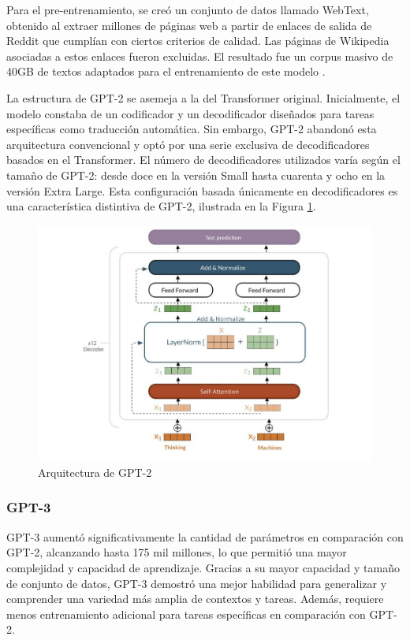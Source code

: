 Para el pre-entrenamiento, se creó un conjunto de datos llamado WebText, obtenido al extraer millones de páginas web a partir de enlaces de salida de Reddit que cumplían con ciertos criterios de calidad. Las páginas de Wikipedia asociadas a estos enlaces fueron excluidas. El resultado fue un corpus masivo de 40GB de textos adaptados para el entrenamiento de este modelo \citep{radford2019language}.

La estructura de GPT-2 se asemeja a la del Transformer original. Inicialmente, el modelo constaba de un codificador y un decodificador diseñados para tareas específicas como traducción automática. Sin embargo, GPT-2 abandonó esta arquitectura convencional y optó por una serie exclusiva de decodificadores basados en el Transformer. El número de decodificadores utilizados varía según el tamaño de GPT-2: desde doce en la versión Small hasta cuarenta y ocho en la versión Extra Large. Esta configuración basada únicamente en decodificadores es una característica distintiva de GPT-2, ilustrada en la Figura \ref{fig:gpt2_architecture}.

\begin{figure}
	\centering
	\includegraphics[scale=0.5]{Imagenes/gpt2_architecture}
	\caption{Arquitectura de GPT-2}
	\label{fig:gpt2_architecture}
\end{figure}

\subsubsection{GPT-3}

GPT-3 aumentó significativamente la cantidad de parámetros en comparación con GPT-2, alcanzando hasta 175 mil millones, lo que permitió una mayor complejidad y capacidad de aprendizaje. Gracias a su mayor capacidad y tamaño de conjunto de datos, GPT-3 demostró una mejor habilidad para generalizar y comprender una variedad más amplia de contextos y tareas. Además, requiere menos entrenamiento adicional para tareas específicas en comparación con GPT-2.


